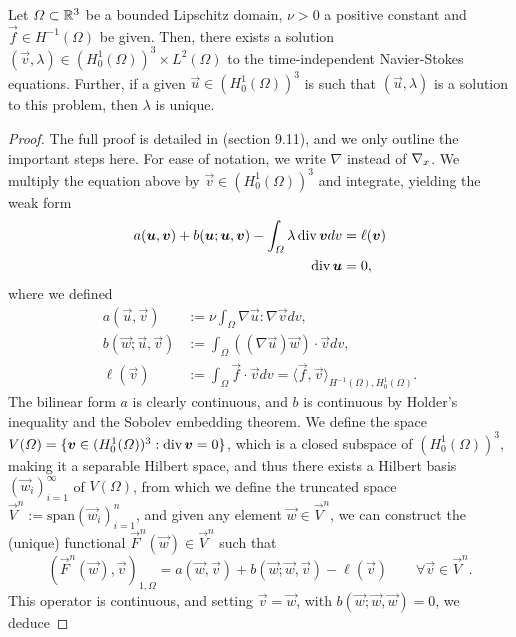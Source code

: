 \begin{theorem}
    Let $\Omega\subset\mathbb{R}^3$ be a bounded Lipschitz domain, $\nu>0$ a positive constant and $\vec f\in H^{-1}(\Omega)$ be given. Then, there exists a solution $(\vec v, \lambda)\in (H_0^1(\Omega))^3\times L^2(\Omega)$ to the time-independent Navier-Stokes equations. Further, if a given $\vec u\in (H_0^1(\Omega))^3$ is such that $(\vec u, \lambda)$ is a solution to this problem, then $\lambda$ is unique. 
    \begin{proof}
        The full proof is detailed in \cite{ciarlet2013linear} (section 9.11), and we only outline the important steps here. For ease of notation, we write $\nabla$ instead of $\nabla_x$. We multiply the equation above by $\vec v \in (H_0^1(\Omega))^3$ and integrate, yielding the weak form
        \begin{align*}
            a(\vec u, \vec v) + b(\vec u; \vec u,\vec v) - \int_\Omega\lambda\dive\vec vdv &= \ell(\vec v)\\
            \dive\vec u &= 0,
        \end{align*}
        where we defined 
        \begin{align*}
            a(\vec u, \vec v) &:= \nu\int_\Omega \nabla\vec u:\nabla\vec v dv,\\
            b(\vec w; \vec u,\vec v) &:= \int_\Omega ((\nabla\vec u)\vec w)\cdot\vec v dv,\\
            \ell(\vec v) &:=  \int_\Omega \vec f\cdot\vec v dv = \langle \vec f, \vec v\rangle_{H^{-1}(\Omega), H_0^1(\Omega)}.
        \end{align*}
        The bilinear form $a$ is clearly continuous, and $b$ is continuous by Holder's inequality and the Sobolev embedding theorem. We define the space $V(\Omega) = \{\vec v \in(H_0^1(\Omega))^3: \dive\vec v = 0\}$, which is a closed subspace of $(H_0^1(\Omega))^3$, making it a separable Hilbert space, and thus there exists a Hilbert basis $(\vec w_i)_{i=1}^\infty$ of $V(\Omega)$, from which we define the truncated space $\vec V^n := \text{span}(\vec w_i)_{i=1}^n$, and given any element $\vec w\in\vec V^n$, we can construct the (unique) functional $\vec F^n(\vec w)\in \vec V^n$ such that 
        \begin{equation*}
            (\vec F^n(\vec w), \vec v)_{1,\Omega} = a(\vec w, \vec v) + b(\vec w; \vec w, \vec v) - \ell(\vec v) \qquad \forall \vec v\in\vec V^n.
        \end{equation*}
        This operator is continuous, and setting $\vec v =\vec w$, with $b(\vec w;\vec w, \vec w) = 0$, we deduce 

\end{proof}
\end{theorem}
